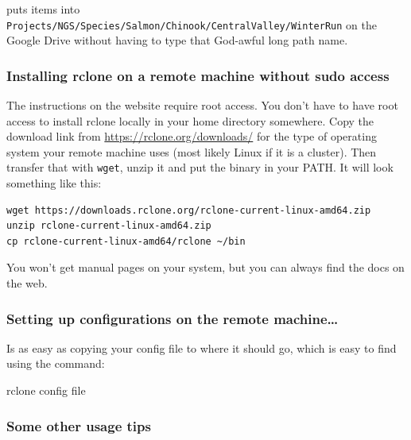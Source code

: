 \documentclass[]{krantz}
\makeatletter
\newenvironment{Shaded}{\begin{snugshade}}{\end{snugshade}}
\newcommand{\ExtensionTok}[1]{#1}
\newcommand{\NormalTok}[1]{#1}
\newenvironment{kframe}{%
\medskip{}
\setlength{\fboxsep}{.8em}
 \def\at@end@of@kframe{}%
 \ifinner\ifhmode%
  \def\at@end@of@kframe{\end{minipage}}%
  \begin{minipage}{\columnwidth}%
 \fi\fi%
 \def\FrameCommand##1{\hskip\@totalleftmargin \hskip-\fboxsep
 \colorbox{shadecolor}{##1}\hskip-\fboxsep
     \hskip-\linewidth \hskip-\@totalleftmargin \hskip\columnwidth}%
 \MakeFramed {\advance\hsize-\width
   \@totalleftmargin\z@ \linewidth\hsize
   \@setminipage}}%
 {\par\unskip\endMakeFramed%
 \at@end@of@kframe}
\renewenvironment{Shaded}{\begin{kframe}}{\end{kframe}}
\makeatother
\begin{document}
puts items into \texttt{Projects/NGS/Species/Salmon/Chinook/CentralValley/WinterRun} on the Google Drive
without having to type that God-awful long path name.

\hypertarget{installing-rclone-on-a-remote-machine-without-sudo-access}{%
\subsubsection{Installing rclone on a remote machine without sudo access}\label{installing-rclone-on-a-remote-machine-without-sudo-access}}

The instructions on the website require root access. You don't have to have root
access to install rclone locally in your home directory somewhere.
Copy the download link from \url{https://rclone.org/downloads/} for
the type of operating system your remote machine uses (most likely Linux if it is a cluster).
Then transfer that with \texttt{wget}, unzip it and put the binary in your PATH. It will look
something like this:

\begin{verbatim}
wget https://downloads.rclone.org/rclone-current-linux-amd64.zip
unzip rclone-current-linux-amd64.zip
cp rclone-current-linux-amd64/rclone ~/bin
\end{verbatim}

You won't get manual pages on your system, but you can always find the docs on the web.

\hypertarget{setting-up-configurations-on-the-remote-machine}{%
\subsubsection{Setting up configurations on the remote machine\ldots{}}\label{setting-up-configurations-on-the-remote-machine}}

Is as easy as copying your config file to where it should go, which
is easy to find using the command:

\begin{Shaded}
\begin{Highlighting}[]
\ExtensionTok{rclone}\NormalTok{ config file}
\end{Highlighting}
\end{Shaded}

\hypertarget{some-other-usage-tips}{%
\subsubsection{Some other usage tips}\label{some-other-usage-tips}}
\end{document}
